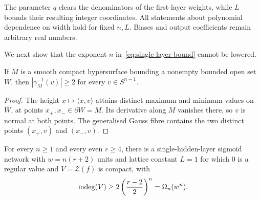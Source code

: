 \begin{remark}
The parameter $q$ clears the denominators of the first-layer weights, while $L$ bounds their resulting integer coordinates. All statements about polynomial dependence on width hold for fixed $n,L$. Biases and output coefficients remain arbitrary real numbers.
\end{remark}

We next show that the exponent $n$ in~\eqref{eq:single-layer-bound} cannot be lowered.

\begin{lemma}\label{lem:bounded-gauss-surjective}
If $M$ is a smooth compact hypersurface bounding a nonempty bounded open set $W$, then $|\gamma_M^{-1}(v)|\ge2$ for every $v\in S^{n-1}$.
\end{lemma}

\begin{proof}
The height $x\mapsto\langle x,v\rangle$ attains distinct maximum and minimum values on $\overline W$, at points $x_+,x_-\in\partial W=M$. Its derivative along $M$ vanishes there, so $v$ is normal at both points. The generalised Gauss fibre contains the two distinct points $(x_+,v)$ and $(x_-,v)$.
\end{proof}

\begin{proposition}\label{prop:single-layer-lowerbound}
For every $n\ge1$ and every even $r\ge4$, there is a single-hidden-layer sigmoid network with $w=n(r+2)$ units and lattice constant $L=1$ for which $0$ is a regular value and $V=\mathcal Z(f)$ is compact, with
\begin{equation}\label{eq:single-layer-lb}
\operatorname{\mathrm{mdeg}}(V)\ge2\left(\frac{r-2}{2}\right)^n=\Omega_n(w^n).
\end{equation}
\end{proposition}

